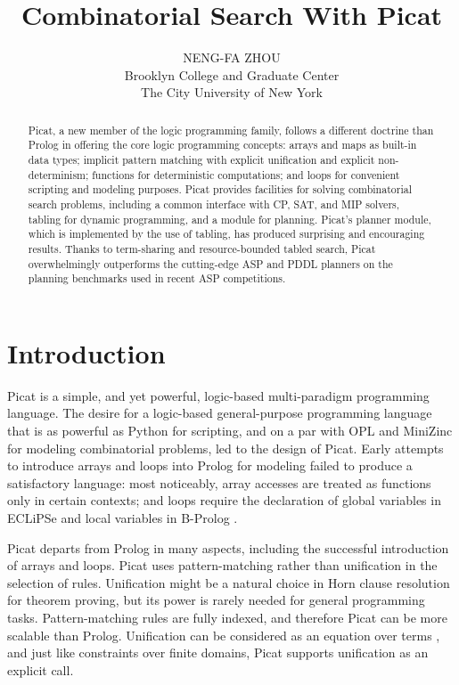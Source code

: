 \documentclass{new_tlp}
\title[Combinatorial Search With Picat]
        {Combinatorial Search With Picat}
\author[N.-F. Zhou]
         {NENG-FA ZHOU\\
         Brooklyn College and Graduate Center \\
         The City University of New York\\
         \email{nzhou@acm.org}}
\begin{document}
\label{firstpage}

\maketitle

  \begin{abstract}
Picat, a new member of the logic programming family, follows a different doctrine than Prolog in offering the core logic programming concepts: arrays and maps as built-in data types; implicit pattern matching with explicit unification and explicit non-determinism; functions for deterministic computations; and loops for convenient scripting and modeling purposes. Picat provides facilities for solving combinatorial search problems, including a common interface with CP, SAT, and MIP solvers, tabling for dynamic programming, and a module for planning. Picat's planner module, which is implemented by the use of tabling, has produced surprising and encouraging results. Thanks to term-sharing and resource-bounded tabled search, Picat overwhelmingly outperforms the cutting-edge ASP and PDDL planners on the planning benchmarks used in recent ASP competitions.
  \end{abstract}



\section{Introduction}
Picat is a simple, and yet powerful, logic-based multi-paradigm programming language. The desire for a logic-based general-purpose programming language that is as powerful as Python for scripting, and on a par with OPL \cite{Hentenryck02} and MiniZinc \cite{NethercoteSBBDT07} for modeling combinatorial problems, led to the design of Picat. Early attempts to introduce arrays and loops into Prolog for modeling failed to produce a satisfactory language: most noticeably, array accesses are treated as functions only in certain contexts; and loops require the declaration of global variables in ECLiPSe \cite{Schimpf02} and local variables in B-Prolog \cite{Zhou12}. 

Picat departs from Prolog in many aspects, including the successful introduction of arrays and loops. Picat uses pattern-matching rather than unification in the selection of rules. Unification might be a natural choice in Horn clause resolution \cite{kowalski1971} for theorem proving, but its power is rarely needed for general programming tasks. Pattern-matching rules are fully indexed, and therefore Picat can be more scalable than Prolog. Unification can be considered as an equation over terms \cite{Colmerauer84}, and just like constraints over finite domains, Picat supports unification as an explicit call.
\end{document}
